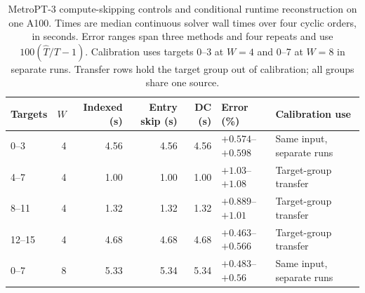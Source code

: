 \begin{table}[!t]
\centering
\caption{MetroPT-3 compute-skipping controls and conditional runtime reconstruction on one A100. Times are median continuous solver wall times over four cyclic orders, in seconds. Error ranges span three methods and four repeats and use $100(\widehat T/T-1)$. Calibration uses targets 0--3 at $W=4$ and 0--7 at $W=8$ in separate runs. Transfer rows hold the target group out of calibration; all groups share one source.}
\label{tab:execution-controls}
\small
\setlength{\tabcolsep}{7pt}
\renewcommand{\arraystretch}{1.15}
\begin{tabular}{@{}lrrrrll@{}}
\toprule
Targets & $W$ & Indexed (s) & Entry skip (s) & DC (s) & Error (\%) & Calibration use \\
\midrule
0--3 & 4 & 4.56 & 4.56 & 4.56 & $+0.574$--$+0.598$ & Same input, separate runs \\
4--7 & 4 & 1.00 & 1.00 & 1.00 & $+1.03$--$+1.08$ & Target-group transfer \\
8--11 & 4 & 1.32 & 1.32 & 1.32 & $+0.889$--$+1.01$ & Target-group transfer \\
12--15 & 4 & 4.68 & 4.68 & 4.68 & $+0.463$--$+0.566$ & Target-group transfer \\
0--7 & 8 & 5.33 & 5.34 & 5.34 & $+0.483$--$+0.56$ & Same input, separate runs \\
\bottomrule
\end{tabular}
\end{table}
